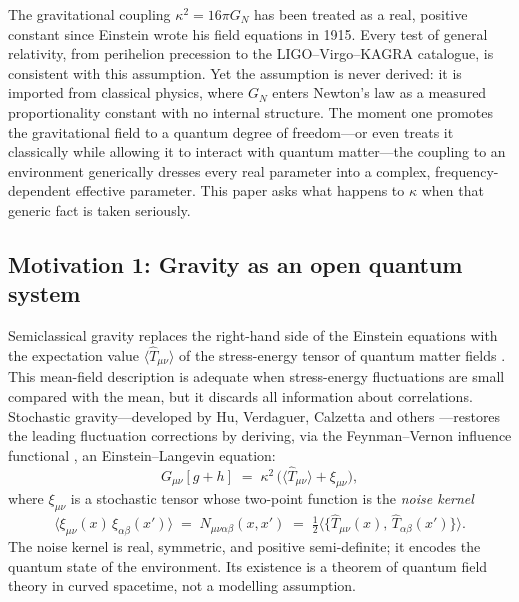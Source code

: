 \documentclass[12pt,a4paper]{article}
\begin{document}
The gravitational coupling $\kappa^{2}=16\pi G_{N}$ has been treated as a real, positive constant since Einstein wrote his field equations in 1915.
Every test of general relativity, from perihelion precession to the LIGO--Virgo--KAGRA catalogue, is consistent with this assumption.
Yet the assumption is never derived: it is imported from classical physics, where $G_{N}$ enters Newton's law as a measured proportionality constant with no internal structure.
The moment one promotes the gravitational field to a quantum degree of freedom---or even treats it classically while allowing it to interact with quantum matter---the coupling to an environment generically dresses every real parameter into a complex, frequency-dependent effective parameter.
This paper asks what happens to $\kappa$ when that generic fact is taken seriously.

\subsection{Motivation 1: Gravity as an open quantum system}\label{sec:mot1}

Semiclassical gravity replaces the right-hand side of the Einstein equations with the expectation value $\langle\hat{T}_{\mu\nu}\rangle$ of the stress-energy tensor of quantum matter fields \cite{HuVerdaguer2008}.
This mean-field description is adequate when stress-energy fluctuations are small compared with the mean, but it discards all information about correlations.
Stochastic gravity---developed by Hu, Verdaguer, Calzetta and others \cite{HuVerdaguer2004,CalzettaHu1994}---restores the leading fluctuation corrections by deriving, via the Feynman--Vernon influence functional \cite{FeynmonVernon1963}, an Einstein--Langevin equation:
\begin{equation}\label{eq:EL}
  G_{\mu\nu}[g+h] \;=\; \kappa^{2}\,\bigl(\langle\hat{T}_{\mu\nu}\rangle + \xi_{\mu\nu}\bigr),
\end{equation}
where $\xi_{\mu\nu}$ is a stochastic tensor whose two-point function is the \emph{noise kernel}
\begin{equation}\label{eq:noisekernel}
  \langle \xi_{\mu\nu}(x)\,\xi_{\alpha\beta}(x')\rangle \;=\; N_{\mu\nu\alpha\beta}(x,x')
  \;=\; \tfrac{1}{2}\bigl\langle\bigl\{\hat{T}_{\mu\nu}(x),\,\hat{T}_{\alpha\beta}(x')\bigr\}\bigr\rangle.
\end{equation}
The noise kernel is real, symmetric, and positive semi-definite; it encodes the quantum state of the environment.
Its existence is a theorem of quantum field theory in curved spacetime, not a modelling assumption.
\end{document}
